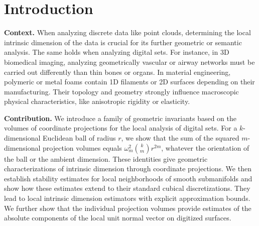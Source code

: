 \section{Introduction}

\noindent\textbf{Context.} When analyzing discrete data like point clouds, determining the
local intrinsic dimension of the data is crucial for its
further geometric or semantic analysis. The same holds when analyzing
digital sets. For instance, in 3D biomedical imaging, analyzing
geometrically vascular or airway networks must be carried out
differently than thin bones or organs. In material engineering,
polymeric or metal foams contain 1D filaments or 2D surfaces depending
on their manufacturing. Their topology and geometry strongly influence
macroscopic physical characteristics, like anisotropic rigidity or
elasticity.

\noindent\textbf{Contribution.}  We introduce a family of geometric
invariants based on the volumes of coordinate projections for the
local analysis of digital sets. For a \(k\)-dimensional Euclidean ball
of radius \(r\), we show that the sum of the squared \(m\)-dimensional
projection volumes equals \(\omega_m^2\binom{k}{m}r^{2m}\), whatever
the orientation of the ball or the ambient dimension. These identities
give geometric characterizations of intrinsic dimension through
coordinate projections. We then establish stability estimates for
local neighborhoods of smooth submanifolds and show how these
estimates extend to their standard cubical discretizations. They lead
to local intrinsic dimension estimators with explicit approximation
bounds. We further show that the individual projection volumes provide
estimates of the absolute components of the local unit normal vector
on digitized surfaces.



